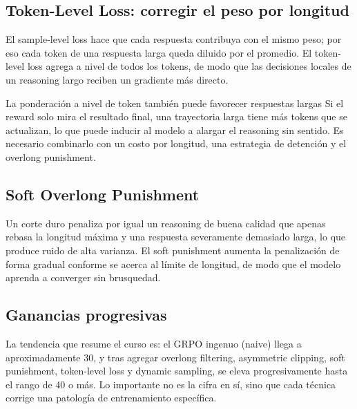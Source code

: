\documentclass[a4paper]{article}
\begin{document}
\subsection{Token-Level Loss: corregir el peso por longitud}

El sample-level loss hace que cada respuesta contribuya con el mismo peso; por eso cada token de una respuesta larga queda diluido por el promedio. El token-level loss agrega a nivel de todos los tokens, de modo que las decisiones locales de un reasoning largo reciben un gradiente más directo.


\begin{warningbox}{La ponderación a nivel de token también puede favorecer respuestas largas}
Si el reward solo mira el resultado final, una trayectoria larga tiene más tokens que se actualizan, lo que puede inducir al modelo a alargar el reasoning sin sentido. Es necesario combinarlo con un costo por longitud, una estrategia de detención y el overlong punishment.
\end{warningbox}

\subsection{Soft Overlong Punishment}

Un corte duro penaliza por igual un reasoning de buena calidad que apenas rebasa la longitud máxima y una respuesta severamente demasiado larga, lo que produce ruido de alta varianza. El soft punishment aumenta la penalización de forma gradual conforme se acerca al límite de longitud, de modo que el modelo aprenda a converger sin brusquedad.


\subsection{Ganancias progresivas}


La tendencia que resume el curso es: el GRPO ingenuo (naive) llega a aproximadamente 30, y tras agregar overlong filtering, asymmetric clipping, soft punishment, token-level loss y dynamic sampling, se eleva progresivamente hasta el rango de 40 o más. Lo importante no es la cifra en sí, sino que cada técnica corrige una patología de entrenamiento específica.
\end{document}
